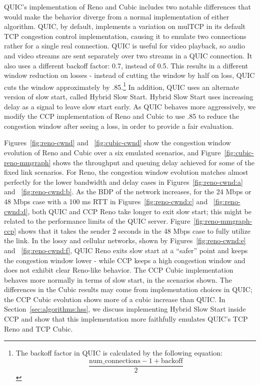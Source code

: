 QUIC's implementation of Reno and Cubic includes two notable differences that would make the behavior diverge from a normal implementation of either algorithm.
QUIC, by default, implements a variation on mulTCP in its default TCP congestion control implementation, causing it to emulate two connections rather for a single real connection.
QUIC is useful for video playback, so audio and video streams are sent separately over two streams in a QUIC connection.
It also uses a different backoff factor: 0.7, instead of 0.5.
This results in a different window reduction on losses - instead of cutting the window by half on loss, QUIC cuts the window approximately by .85.\footnote{The backoff factor in QUIC is calculated by the following equation: $$\frac{\textrm{num\_connections} - 1 + \textrm{backoff}} {2}$$}
In addition, QUIC uses an alternate version of slow start, called Hybrid Slow Start.
Hybrid Slow Start uses increasing delay as a signal to leave slow start early.
As QUIC behaves more aggressively, we modify the CCP implementation of Reno and Cubic to use .85 to reduce the congestion window after seeing a loss, in order to provide a fair evaluation.

Figures~\ref{fig:reno-cwnd} and ~\ref{fig:cubic-cwnd} show the congestion window evolution of Reno and Cubic over a six emulated scenarios, and Figure~\ref{fig:cubic-reno-mmgraph} shows the throughput and queuing delay achieved for some of the fixed link scenarios.
For Reno, the congestion window evolution matches almost perfectly for the lower bandwidth and delay cases in Figures~\ref{fig:reno-cwnd:a} and ~\ref{fig:reno-cwnd:b}.
As the BDP of the network increases, for the 24 Mbps or 48 Mbps case with a 100 ms RTT in Figures~\ref{fig:reno-cwnd:c} and ~\ref{fig:reno-cwnd:d}, both QUIC and CCP Reno take longer to exit slow start; this might be related to the performance limits of the QUIC server.
Figure~\ref{fig:reno-mmgraph-ccp} shows that it takes the sender 2 seconds in the 48 Mbps case to fully utilize the link.
In the lossy and cellular networks, shown by Figures~\ref{fig:reno-cwnd:e} and ~\ref{fig:reno-cwnd:f}, QUIC Reno exits slow start at a ``safer'' point and keeps the congestion window lower - while CCP keeps a high congestion window and does not exhibit clear Reno-like behavior.
The CCP Cubic implementation behaves more normally in terms of slow start, in the scenarios shown.
The differences in the Cubic results may come from implementation choices in QUIC; the CCP Cubic evolution shows more of a cubic increase than QUIC.
In Section~\ref{sec:algorithms:hss}, we discuss implementing Hybrid Slow Start inside CCP and show that this implementation more faithfully emulates QUIC's TCP Reno and TCP Cubic.

